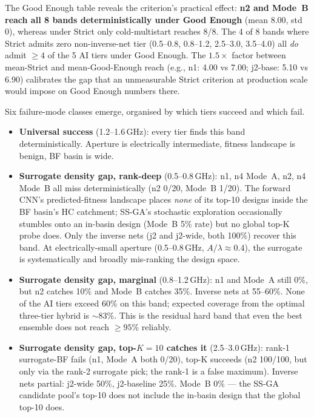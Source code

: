 The Good Enough table reveals the criterion's practical effect:
\textbf{n2 and Mode~B reach all 8 bands deterministically under Good
Enough} (mean 8.00, std 0), whereas under Strict only cold-multistart
reaches 8/8. The 4 of 8 bands where Strict admits zero non-inverse-net
tier (0.5--0.8, 0.8--1.2, 2.5--3.0, 3.5--4.0) all \emph{do} admit
$\geq 4$ of the 5 AI tiers under Good Enough. The $1.5\times$ factor
between mean-Strict and mean-Good-Enough reach (e.g., n1: 4.00 vs
7.00; j2-base: 5.10 vs 6.90) calibrates the gap that an unmeasurable
Strict criterion at production scale would impose on Good Enough
numbers there.

Six failure-mode classes emerge, organised by which tiers succeed
and which fail.

\begin{itemize}
\item \textbf{Universal success} (1.2--1.6\,GHz): every tier finds
this band deterministically. Aperture is electrically intermediate,
fitness landscape is benign, BF basin is wide.

\item \textbf{Surrogate density gap, rank-deep} (0.5--0.8\,GHz):
n1, n4 Mode~A, n2, n4 Mode~B all miss deterministically (n2 0/20,
Mode~B 1/20). The forward CNN's predicted-fitness landscape places
\emph{none} of its top-10 designs inside the BF basin's HC catchment;
SS-GA's stochastic exploration occasionally stumbles onto an
in-basin design (Mode~B 5\% rate) but no global top-K probe does.
Only the inverse nets (j2 and j2-wide, both 100\%) recover this band.
At electrically-small aperture (0.5--0.8\,GHz, $A/\lambda \approx
0.4$), the surrogate is systematically and broadly mis-ranking the
design space.

\item \textbf{Surrogate density gap, marginal} (0.8--1.2\,GHz):
n1 and Mode~A still 0\%, but n2 catches 10\% and Mode~B catches 35\%.
Inverse nets at 55--60\%. None of the AI tiers exceed 60\% on this
band; expected coverage from the optimal three-tier hybrid is
$\sim$83\%. This is the residual hard band that even the best
ensemble does not reach $\geq 95$\% reliably.

\item \textbf{Surrogate density gap, top-$K{=}10$ catches it}
(2.5--3.0\,GHz): rank-1 surrogate-BF fails (n1, Mode~A both 0/20),
top-K succeeds (n2 100/100, but only via the rank-2 surrogate pick;
the rank-1 is a false maximum). Inverse nets partial: j2-wide 50\%,
j2-baseline 25\%. Mode~B 0\% --- the SS-GA candidate pool's top-10
does not include the in-basin design that the global top-10 does.


\end{itemize}
